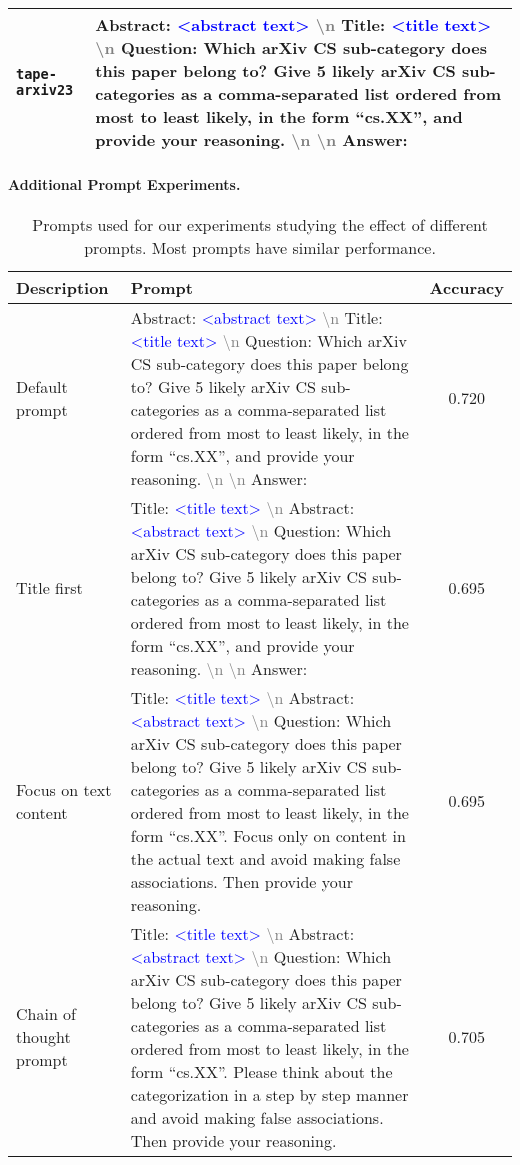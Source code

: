 \documentclass{article}
\newcommand{\promptfield}[1]{\textcolor{blue}{<#1>}}
\newcommand{\newl}{\textcolor{gray}{\textbackslash n }}
\begin{document}
\begin{table}[!ht]
\begin{tabularx}{\textwidth}{lX}
         \\
         \midrule
         \texttt{tape-arxiv23}
         &{Abstract: \promptfield{abstract text} \newl Title: \promptfield{title text} \newl Question: Which arXiv CS sub-category does this paper belong to? Give 5 likely arXiv CS sub-categories as a comma-separated list ordered from most to least likely, in the form ``cs.XX'', and provide your reasoning. \newl \newl Answer:}\\
         \bottomrule
    \end{tabularx}
\end{table}


\paragraph{Additional Prompt Experiments.}

\begin{table}[!ht]
\small
    \centering
\caption{Prompts used for our experiments studying the effect of different prompts. Most prompts have similar performance. }
    \label{tab: prompt experiment}
    \begin{tabularx}{\textwidth}{lXc}
    \toprule
         Description & Prompt & Accuracy\\
         \midrule
         Default prompt & Abstract: \promptfield{abstract text} \newl Title: \promptfield{title text} \newl Question: Which arXiv CS sub-category does this paper belong to? Give 5 likely arXiv CS sub-categories as a comma-separated list ordered from most to least likely, in the form ``cs.XX'', and provide your reasoning. \newl \newl Answer: & 0.720\\  
         \midrule
         Title first & Title: \promptfield{title text} \newl Abstract: \promptfield{abstract text} \newl Question: Which arXiv CS sub-category does this paper belong to? Give 5 likely arXiv CS sub-categories as a comma-separated list ordered from most to least likely, in the form ``cs.XX'', and provide your reasoning. \newl \newl Answer: & 0.695\\  
         \midrule
         Focus on text content & Title: \promptfield{title text} \newl Abstract: \promptfield{abstract text} \newl Question: Which arXiv CS sub-category does this paper belong to? Give 5 likely arXiv CS sub-categories as a comma-separated list ordered from most to least likely, in the form ``cs.XX''. Focus only on content in the actual text and avoid making false associations. Then provide your reasoning.  & 0.695\\  
         \midrule
         Chain of thought prompt & Title: \promptfield{title text} \newl Abstract: \promptfield{abstract text} \newl Question: Which arXiv CS sub-category does this paper belong to? Give 5 likely arXiv CS sub-categories as a comma-separated list ordered from most to least likely, in the form ``cs.XX''. Please think about the categorization in a step by step manner and avoid making false associations. Then provide your reasoning.   & 0.705\\  
         \bottomrule
    \end{tabularx}
\end{table}
\end{document}
